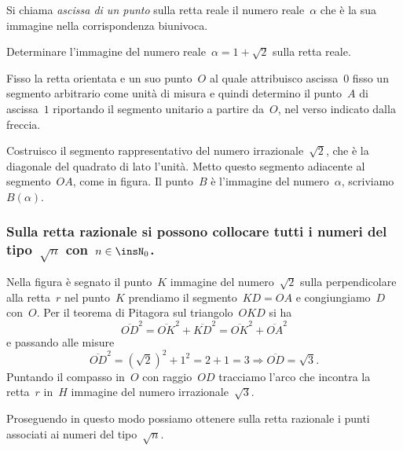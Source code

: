 \begin{definizione}
Si chiama \emph{ascissa di un punto} sulla retta reale il numero reale~$\alpha$ 
che è la sua immagine nella corrispondenza biunivoca.
\end{definizione}

\begin{exrig}
 \begin{esempio}
Determinare l'immagine del numero reale~$\alpha =1+\sqrt{2}$ sulla retta reale.

Fisso la retta orientata e un suo punto~$O$ al quale attribuisco ascissa~$0$
fisso un segmento arbitrario come unità di misura e quindi determino il 
punto~$A$ di ascissa~$1$ riportando il segmento unitario
a partire da~$O$, nel verso indicato dalla freccia.
\begin{center}
 
\end{center}

Costruisco il segmento rappresentativo del numero irrazionale~$\sqrt{2}$, che è 
la diagonale del quadrato di lato l'unità.
Metto questo segmento adiacente al segmento~$OA$, come in figura.
Il punto~$B$ è l'immagine del numero~$\alpha$, scriviamo~$B(\alpha)$.
\begin{center}
 
\end{center}
 \end{esempio}
\end{exrig}

\subsubsection*{Sulla retta razionale si possono collocare tutti i numeri del 
tipo~$\sqrt{n}$ con~$n\in \insN_{0}$.}

Nella figura è segnato il punto~$K$ immagine del numero~$\sqrt{2}$ sulla 
perpendicolare alla retta~$r$ nel punto~$K$
prendiamo il segmento~$KD=OA$ e congiungiamo~$D$ con~$O$. Per il teorema di 
Pitagora sul
triangolo~$OKD$ si ha
\[\overline{OD}^{2}=\overline{OK}^{2}+\overline{KD}^{2}=\overline{OK}^{2}
+\overline{OA}^{2}\]
e passando alle misure
\[\overline{OD}^{2}=(\sqrt{2})^{2}+1^{2}=2+1=3\Rightarrow\overline{OD}=\sqrt{3}
.\]
Puntando il compasso in~$O$ con raggio~${OD}$ tracciamo l'arco che incontra la 
retta~$r$ in~$H$ immagine
del numero irrazionale~${\sqrt{3}}$.
\begin{center}
 
\end{center}
Proseguendo in questo modo possiamo ottenere sulla retta razionale i punti 
associati ai numeri del tipo~${\sqrt{n}}$.

